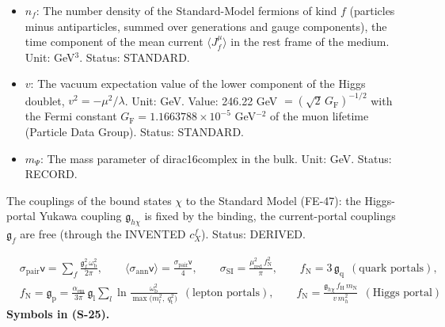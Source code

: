 \documentclass[
  10pt,
]{article}
\begin{document}
\begin{itemize}
  GeV\(^2\) (field strength). Status: AUTHOR.
\item
  \(n_f\): The number density of the Standard-Model fermions of kind
  \(f\) (particles minus antiparticles, summed over generations and
  gauge components), the time component of the mean current
  \(\langle J_f^\mu\rangle\) in the rest frame of the medium. Unit:
  GeV\(^3\). Status: STANDARD.
\item
  \(v\): The vacuum expectation value of the lower component of the
  Higgs doublet, \(v^2 = -\mu^2/\lambda\). Unit: GeV. Value: 246.22 GeV
  \(= (\sqrt2\,G_{\mathrm{F}})^{-1/2}\) with the Fermi constant
  \(G_{\mathrm{F}} = 1.1663788\times10^{-5}\) GeV\(^{-2}\) of the muon
  lifetime (Particle Data Group). Status: STANDARD.
\item
  \(m_\Psi\): The mass parameter of dirac16complex in the bulk. Unit:
  GeV. Status: RECORD.
\end{itemize}

The couplings of the bound states \(\chi\) to the Standard Model
(FE-47): the Higgs-portal Yukawa coupling \(\mathfrak{g}_{h\chi}\) is
fixed by the binding, the current-portal couplings \(\mathfrak{g}_f\)
are free (through the INVENTED \(c^{f}_X\)). Status: DERIVED.

\[
\begin{aligned}
&\sigma_{\mathrm{pair}}\mathsf{v} = \sum_f\frac{\mathfrak{g}_f^2\,\omega_{\mathrm{b}}^2}{2\pi},\qquad
 \langle\sigma_{\mathrm{ann}}\mathsf{v}\rangle = \frac{\sigma_{\mathrm{pair}}\mathsf{v}}{4},\qquad
 \sigma_{\mathrm{SI}} = \frac{\mu_{\mathrm{red}}^2\,f_{\mathrm{N}}^2}{\pi},\qquad f_{\mathrm{N}} = 3\,\mathfrak{g}_{\mathrm{q}}\ \ (\text{quark portals}),\\
&f_{\mathrm{N}} = \mathfrak{g}_{\mathrm{p}} = \frac{\alpha_{\mathrm{em}}}{3\pi}\,\mathfrak{g}_{\mathrm{l}}\sum_{l}\ln\frac{\omega_{\mathrm{b}}^2}{\max\big(m_l^2,\ q_{\mathrm{t}}^2\big)}\ \ (\text{lepton portals}),\qquad
 f_{\mathrm{N}} = \frac{\mathfrak{g}_{h\chi}\,f_{\mathrm{H}}\,m_{\mathrm{N}}}{v\,m_h^2}\ \ (\text{Higgs portal})
\end{aligned} \tag{S-25}
\] \textbf{Symbols in (S-25).}
\end{document}
